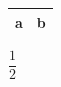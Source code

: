 \documentclass{article}
\begin{document}
\begin{tabular}{ll}\toprule a & b \\\bottomrule\end{tabular}
$\dfrac{1}{2}$
\end{document}

